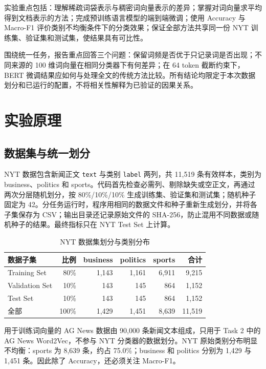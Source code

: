 \documentclass[UTF8,a4paper,10pt]{ctexart}
\newcommand{\method}[1]{\texttt{#1}}
\begin{document}
实验重点包括：理解稀疏词袋表示与稠密词向量表示的差异；掌握对词向量求平均得到文档表示的方法；完成预训练语言模型的端到端微调；使用 Accuracy 与 Macro-F1 评价类别不均衡条件下的分类效果；保证全部方法共享同一份 NYT 训练集、验证集和测试集，使结果具有可比性。

围绕统一任务，报告重点回答三个问题：保留词频是否优于只记录词是否出现；不同来源的 100 维词向量在相同分类器下有何差异；在 64 token 截断约束下，BERT 微调结果应如何与处理全文的传统方法比较。所有结论均限定于本次数据划分和已运行的配置，不将相关性解释为已验证的因果关系。

\section{实验原理}

\subsection{数据集与统一划分}

NYT 数据包含新闻正文 \method{text} 与类别 \method{label} 两列，共 11,519 条有效样本，类别为 business、politics 和 sports。代码首先检查必需列、剔除缺失或空正文，再通过两次分层随机划分，按 80\%/10\%/10\% 生成训练集、验证集和测试集；随机种子固定为 42。分任务运行时，程序用相同的数据文件和种子重新生成划分，并将各子集保存为 CSV；输出目录还记录原始文件的 SHA-256，防止混用不同数据或随机种子的结果。最终指标只在 NYT Test Set 上计算。

\begin{table}[H]
  \centering
  \caption{NYT 数据集划分与类别分布}
  \label{tab:split}
  \begin{tabular}{lrrrrr}
    \toprule
    数据子集 & 比例 & business & politics & sports & 合计 \\
    \midrule
    Training Set   & 80\% & 1,143 & 1,161 & 6,911 & 9,215 \\
    Validation Set & 10\% &   143 &   145 &   864 & 1,152 \\
    Test Set       & 10\% &   143 &   145 &   864 & 1,152 \\
    \midrule
    全部            & 100\% & 1,429 & 1,451 & 8,639 & 11,519 \\
    \bottomrule
  \end{tabular}
\end{table}

用于训练词向量的 AG News 数据由 90,000 条新闻文本组成，只用于 Task 2 中的 AG News Word2Vec，不参与 NYT 分类器的数据划分。NYT 原始类别分布明显不均衡：sports 为 8,639 条，约占 75.0\%；business 和 politics 分别为 1,429 与 1,451 条。因此除了 Accuracy，还必须关注 Macro-F1。
\end{document}

